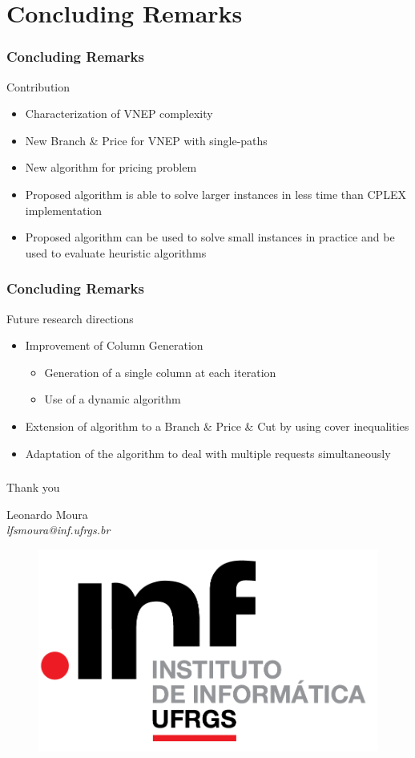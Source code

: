 \documentclass[english]{beamer}
\begin{document}
\section{Concluding Remarks}
\begin{frame}
\frametitle{Concluding Remarks}
Contribution
\begin{itemize}
  \item Characterization of VNEP complexity
	\item New Branch \& Price for VNEP with single-paths
  \item New algorithm for pricing problem
  \item Proposed algorithm is able to solve larger instances in less time than CPLEX implementation
  \item Proposed algorithm can be used to solve small instances in practice and be used to evaluate heuristic algorithms
\end{itemize}
\end{frame}
\begin{frame}
\frametitle{Concluding Remarks}
Future research directions
\begin{itemize}
  \item Improvement of Column Generation
  \begin{itemize}
    \item Generation of a single column at each iteration
    \item Use of a dynamic algorithm
  \end{itemize}
  \item Extension of algorithm to a Branch \& Price \& Cut by using cover inequalities
  \item Adaptation of the algorithm to deal with multiple requests simultaneously
\end{itemize}
\end{frame}
\begin{frame}
\frametitle{}
\begin{center} 
  { \huge Thank you }
  
  \bigskip
  Leonardo Moura \\
  \textit{lfsmoura@inf.ufrgs.br}
  \begin{figure}
      \centering
      \includegraphics[scale=0.4]{inf.png}
  \end{figure}
\end{center}
\end{frame}
\end{document}
